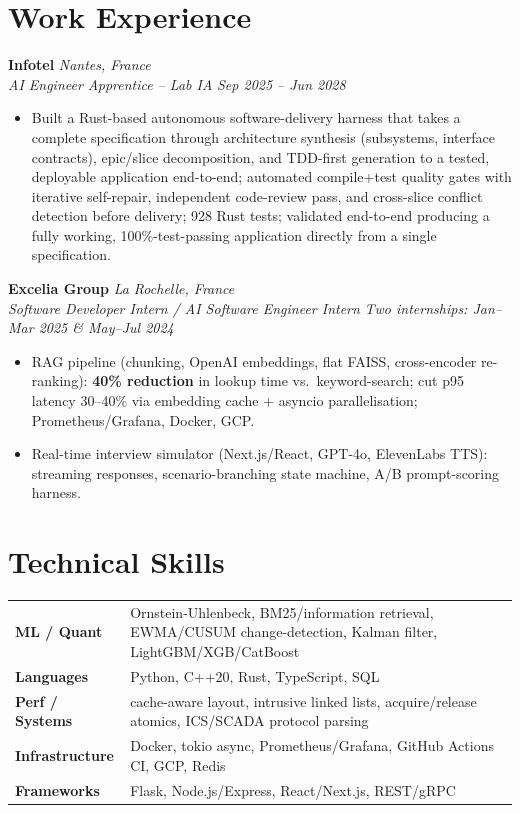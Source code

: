 \documentclass[10pt]{article}
\newcommand{\entry}[4]{%
  \noindent\textbf{#1} \hfill \textit{#2} \\
  \textit{#3} \hfill \textit{#4}\\[-0.3em]
}
\begin{document}
\section*{Work Experience}
\entry{Infotel}{Nantes, France}{AI Engineer Apprentice -- Lab IA}{Sep 2025 -- Jun 2028}
\begin{itemize}
  \item Built a Rust-based autonomous software-delivery harness that takes a complete specification through architecture synthesis (subsystems, interface contracts), epic/slice decomposition, and TDD-first generation to a tested, deployable application end-to-end; automated compile+test quality gates with iterative self-repair, independent code-review pass, and cross-slice conflict detection before delivery; 928 Rust tests; validated end-to-end producing a fully working, 100\%-test-passing application directly from a single specification.
\end{itemize}
\entry{Excelia Group}{La Rochelle, France}{Software Developer Intern / AI Software Engineer Intern}{Two internships: Jan--Mar 2025 \& May--Jul 2024}
\begin{itemize}
  \item RAG pipeline (chunking, OpenAI embeddings, flat FAISS, cross-encoder re-ranking): \textbf{40\% reduction} in lookup time vs.\ keyword-search; cut p95 latency 30--40\% via embedding cache + asyncio parallelisation; Prometheus/Grafana, Docker, GCP.
  \item Real-time interview simulator (Next.js/React, GPT-4o, ElevenLabs TTS): streaming responses, scenario-branching state machine, A/B prompt-scoring harness.
\end{itemize}

\section*{Technical Skills}
\noindent
\begin{tabular}{@{}p{2.7cm}p{15.5cm}@{}}
\textbf{ML / Quant} & Ornstein-Uhlenbeck, BM25/information retrieval, EWMA/CUSUM change-detection, Kalman filter, LightGBM/XGB/CatBoost \\
\textbf{Languages} & Python, C++20, Rust, TypeScript, SQL \\
\textbf{Perf / Systems} & cache-aware layout, intrusive linked lists, acquire/release atomics, ICS/SCADA protocol parsing \\
\textbf{Infrastructure} & Docker, tokio async, Prometheus/Grafana, GitHub Actions CI, GCP, Redis \\
\textbf{Frameworks} & Flask, Node.js/Express, React/Next.js, REST/gRPC \\
\end{tabular}
\end{document}
